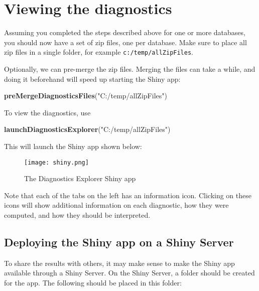 \documentclass[
]{article}
\newenvironment{Shaded}{\begin{snugshade}}{\end{snugshade}}
\newcommand{\KeywordTok}[1]{\textcolor[rgb]{0.13,0.29,0.53}{\textbf{#1}}}
\newcommand{\NormalTok}[1]{#1}
\newcommand{\StringTok}[1]{\textcolor[rgb]{0.31,0.60,0.02}{#1}}
\begin{document}
\hypertarget{viewing-the-diagnostics}{%
\section{Viewing the diagnostics}\label{viewing-the-diagnostics}}

Assuming you completed the steps described above for one or more
databases, you should now have a set of zip files, one per database.
Make sure to place all zip files in a single folder, for example
\texttt{c:/temp/allZipFiles}.

Optionally, we can pre-merge the zip files. Merging the files can take a
while, and doing it beforehand will speed up starting the Shiny app:

\begin{Shaded}
\begin{Highlighting}[]
\KeywordTok{preMergeDiagnosticsFiles}\NormalTok{(}\StringTok{"C:/temp/allZipFiles"}\NormalTok{)}
\end{Highlighting}
\end{Shaded}

To view the diagnostics, use

\begin{Shaded}
\begin{Highlighting}[]
\KeywordTok{launchDiagnosticsExplorer}\NormalTok{(}\StringTok{"C:/temp/allZipFiles"}\NormalTok{)}
\end{Highlighting}
\end{Shaded}

This will launch the Shiny app shown below:

\begin{figure}
\centering
\texttt{[image: shiny.png]}
\caption{The Diagnostics Explorer Shiny app}
\end{figure}

Note that each of the tabs on the left has an information icon. Clicking
on these icons will show additional information on each diagnostic, how
they were computed, and how they should be interpreted.

\hypertarget{deploying-the-shiny-app-on-a-shiny-server}{%
\subsection{Deploying the Shiny app on a Shiny
Server}\label{deploying-the-shiny-app-on-a-shiny-server}}

To share the results with others, it may make sense to make the Shiny
app available through a Shiny Server. On the Shiny Server, a folder
should be created for the app. The following should be placed in this
folder:
\end{document}
